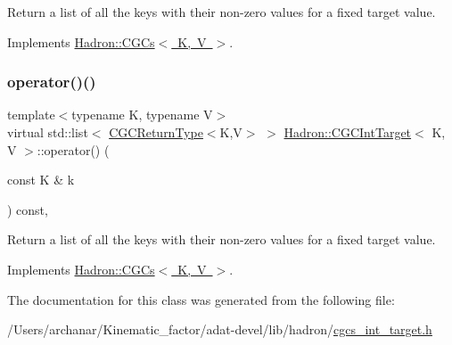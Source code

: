 Return a list of all the keys with their non-\/zero values for a fixed target value. 



Implements \mbox{\hyperlink{classHadron_1_1CGCs_a8d2d80be37b603359708ebdd5923ff47}{Hadron\+::\+C\+G\+Cs$<$ K, V $>$}}.

\mbox{\label{classHadron_1_1CGCIntTarget_a5946627ddb796961b97b7e0c57e32d83}} 
\subsubsection{\texorpdfstring{operator()()}{operator()()}\hspace{0.1cm}{\footnotesize\ttfamily [6/6]}}
{\footnotesize\ttfamily template$<$typename K, typename V$>$ \\
virtual std\+::list$<$ \mbox{\hyperlink{structHadron_1_1CGCReturnType}{C\+G\+C\+Return\+Type}}$<$K,V$>$ $>$ \mbox{\hyperlink{classHadron_1_1CGCIntTarget}{Hadron\+::\+C\+G\+C\+Int\+Target}}$<$ K, V $>$\+::operator() (\begin{DoxyParamCaption}\item[{const K \&}]{k }\end{DoxyParamCaption}) const\hspace{0.3cm}{\ttfamily [inline]}, {\ttfamily [virtual]}}



Return a list of all the keys with their non-\/zero values for a fixed target value. 



Implements \mbox{\hyperlink{classHadron_1_1CGCs_a8d2d80be37b603359708ebdd5923ff47}{Hadron\+::\+C\+G\+Cs$<$ K, V $>$}}.



The documentation for this class was generated from the following file\+:\begin{DoxyCompactItemize}
\item 
/\+Users/archanar/\+Kinematic\+\_\+factor/adat-\/devel/lib/hadron/\mbox{\hyperlink{adat-devel_2lib_2hadron_2cgcs__int__target_8h}{cgcs\+\_\+int\+\_\+target.\+h}}\end{DoxyCompactItemize}
